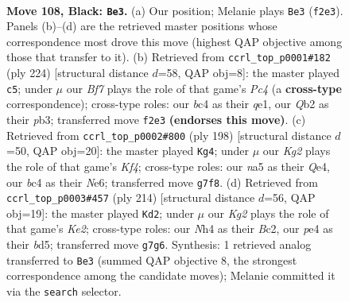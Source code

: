 \documentclass[11pt]{article}
\begin{document}
\clearpage

\begin{figure}[p]\centering
\begin{subfigure}{0.46\textwidth}\centering
\resizebox{\linewidth}{!}{%
\newchessgame
\chessboard[
  setfen={8/6k1/n7/N7/PpB1P2n/8/1q3b1p/3K4 b - - 9 108},
  showmover=false,
  pgfstyle=straightmove, color=movearrow, markmove={f2-e3}
]}
\caption{}
\end{subfigure}\hfill
\begin{subfigure}{0.46\textwidth}\centering
\resizebox{\linewidth}{!}{%
\newchessgame
\chessboard[
  setfen={6BK/3r4/8/p7/P1P2Q2/1pk3P1/8/4q3 w - - 0 113},
  showmover=false,
  pgfstyle=straightmove, color=movearrow, markmove={c4-c5}
]}
\caption{}
\end{subfigure}
\\[4pt]
\begin{subfigure}{0.46\textwidth}\centering
\resizebox{\linewidth}{!}{%
\newchessgame
\chessboard[
  setfen={6k1/6b1/4N2p/q6P/4QK2/8/6P1/8 w - - 19 100},
  showmover=false,
  pgfstyle=straightmove, color=movearrow, markmove={f4-g4}
]}
\caption{}
\end{subfigure}\hfill
\begin{subfigure}{0.46\textwidth}\centering
\resizebox{\linewidth}{!}{%
\newchessgame
\chessboard[
  setfen={8/3k4/1b3p2/3bnN2/P7/2B5/2B1K3/8 w - - 9 108},
  showmover=false,
  pgfstyle=straightmove, color=movearrow, markmove={e2-d2}
]}
\caption{}
\end{subfigure}
\caption{\textbf{Move 108, Black: \texttt{Be3}.} (a) Our position; Melanie plays \texttt{Be3} (\texttt{f2e3}). Panels (b)--(d) are the retrieved master positions whose correspondence most drove this move (highest QAP objective among those that transfer to it). (b) Retrieved from \texttt{ccrl\_top\_p0001\#182} (ply 224) [structural distance $d$=58, QAP obj=8]: the master played \texttt{c5}; under $\mu$ our \emph{Bf7} plays the role of that game's \emph{Pc4} (a \textbf{cross-type} correspondence); cross-type roles: our \emph{b}c4 as their \emph{q}e1, our \emph{Q}b2 as their \emph{p}b3; transferred move \texttt{f2e3} \textbf{(endorses this move)}. (c) Retrieved from \texttt{ccrl\_top\_p0002\#800} (ply 198) [structural distance $d$=50, QAP obj=20]: the master played \texttt{Kg4}; under $\mu$ our \emph{Kg2} plays the role of that game's \emph{Kf4}; cross-type roles: our \emph{n}a5 as their \emph{Q}e4, our \emph{b}c4 as their \emph{N}e6; transferred move \texttt{g7f8}. (d) Retrieved from \texttt{ccrl\_top\_p0003\#457} (ply 214) [structural distance $d$=56, QAP obj=19]: the master played \texttt{Kd2}; under $\mu$ our \emph{Kg2} plays the role of that game's \emph{Ke2}; cross-type roles: our \emph{N}h4 as their \emph{B}c2, our \emph{p}e4 as their \emph{b}d5; transferred move \texttt{g7g6}. Synthesis: 1 retrieved analog transferred to \texttt{Be3} (summed QAP objective 8, the strongest correspondence among the candidate moves); Melanie committed it via the \texttt{search} selector.}
\label{fig:thought-m215}
\end{figure}
\end{document}
